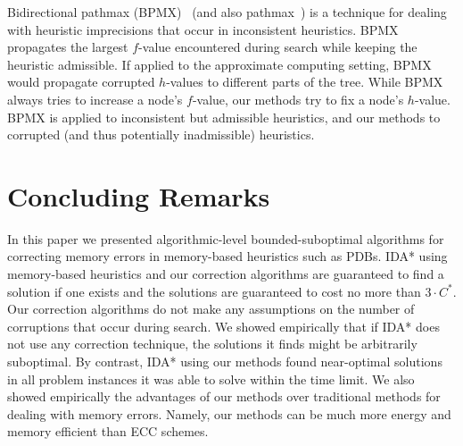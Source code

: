 \documentclass[letterpaper]{article}
\begin{document}
Bidirectional pathmax (BPMX)~\cite{FelnerZHSSZ11} (and also pathmax~\cite{mero1984aHeuristicSearch}) is a technique for dealing with heuristic imprecisions that occur in inconsistent heuristics. BPMX propagates the largest $f$-value encountered during search while keeping the heuristic admissible. If applied to the approximate computing setting, BPMX would propagate corrupted $h$-values to different parts of the tree. While BPMX always tries to increase a node's $f$-value, our methods try to fix a node's $h$-value. %
BPMX is applied to inconsistent but admissible heuristics,
and our methods to corrupted (and thus potentially inadmissible) heuristics.







































\vspace{-0.83mm}
\vspace{-1.43mm}
\section{Concluding Remarks}

In this paper we presented algorithmic-level bounded-suboptimal algorithms for correcting memory errors in memory-based heuristics such as PDBs. %
IDA* using memory-based heuristics and our correction algorithms are guaranteed to find a solution if one exists and the solutions are guaranteed to cost no more than $3 \cdot C^*$. Our correction algorithms do not make any assumptions on the number of corruptions that occur during search. We showed empirically that if IDA* does not use any correction technique, the solutions it finds might be arbitrarily suboptimal. %
By contrast, IDA* using our methods found near-optimal solutions in all problem instances it was able to solve within the time limit. We also showed empirically the advantages of our methods over traditional methods for dealing with memory errors. Namely, our methods can be much more energy and memory efficient than ECC schemes.
\end{document}
